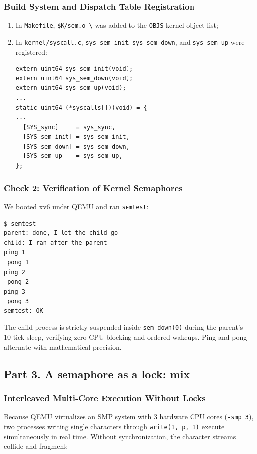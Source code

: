 \documentclass{labreport}
\begin{document}
\subsubsection{Build System and Dispatch Table Registration}
\begin{enumerate}[label=(\alph*), noitemsep]
    \item In \texttt{Makefile}, \texttt{\$K/sem.o \textbackslash} was added to the \texttt{OBJS} kernel object list;
    \item In \texttt{kernel/syscall.c}, \texttt{sys\_sem\_init}, \texttt{sys\_sem\_down}, and \texttt{sys\_sem\_up} were registered:
\begin{lstlisting}[style=c]
extern uint64 sys_sem_init(void);
extern uint64 sys_sem_down(void);
extern uint64 sys_sem_up(void);
...
static uint64 (*syscalls[])(void) = {
...
  [SYS_sync]     = sys_sync,
  [SYS_sem_init] = sys_sem_init,
  [SYS_sem_down] = sys_sem_down,
  [SYS_sem_up]   = sys_sem_up,
};
\end{lstlisting}
\end{enumerate}

\subsubsection{Check 2: Verification of Kernel Semaphores}
We booted xv6 under QEMU and ran \texttt{semtest}:

\begin{lstlisting}[style=bash]
$ semtest
parent: done, I let the child go
child: I ran after the parent
ping 1
 pong 1
ping 2
 pong 2
ping 3
 pong 3
semtest: OK
\end{lstlisting}

The child process is strictly suspended inside \texttt{sem\_down(0)} during the parent's 10-tick sleep, verifying zero-CPU blocking and ordered wakeups. Ping and pong alternate with mathematical precision.

\subsection{Part 3. A semaphore as a lock: mix}

\subsubsection{Interleaved Multi-Core Execution Without Locks}
Because QEMU virtualizes an SMP system with 3 hardware CPU cores (\texttt{-smp 3}), two processes writing single characters through \texttt{write(1, p, 1)} execute simultaneously in real time. Without synchronization, the character streams collide and fragment:
\end{document}

